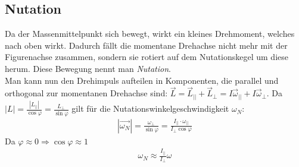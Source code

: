 \documentclass[12pt,a4paper,titlepage,headinclude,bibtotoc]{scrartcl}
\begin{document}
\subsection{Nutation}

Da der Massenmittelpunkt sich bewegt, wirkt ein kleines Drehmoment, welches nach oben wirkt.
Dadurch fällt die momentane Drehachse nicht mehr mit der Figurenachse zusammen, sondern sie rotiert auf dem Nutationskegel um diese herum.
Diese Bewegung nennt man \emph{Nutation}.\\
Man kann nun den Drehimpuls aufteilen in Komponenten, die parallel und orthogonal zur momentanen Drehachse sind: $\vec L=\vec L_{||}+\vec L_\perp=I\vec\omega_{||}+I\vec\omega_\perp$. Da $|L|=\frac{|L_{||}|}{\cos\varphi}=\frac{L_\perp}{\sin\varphi}$ gilt für die Nutationswinkelgeschwindigkeit $\omega_N$:
\begin{align*}
|\vec{\omega_N}|=\frac{\omega_\perp}{\sin\varphi}=\frac{I_{||}\cdot\omega_{||}}{I_\perp\cos\varphi}
\end{align*}
Da $\varphi\approx 0\Rightarrow \cos\varphi\approx 1$
\begin{align}
\omega_N\approx\frac{I_{||}}{I_\perp}\omega
\end{align}


 
\end{document}
